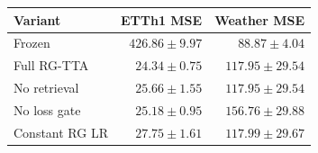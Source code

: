 \begin{tabular}{lrr}
\toprule
Variant & ETTh1 MSE & Weather MSE \\
\midrule
Frozen & $426.86\pm9.97$ & $88.87\pm4.04$ \\
Full RG-TTA & $24.34\pm0.75$ & $117.95\pm29.54$ \\
No retrieval & $25.66\pm1.55$ & $117.95\pm29.54$ \\
No loss gate & $25.18\pm0.95$ & $156.76\pm29.88$ \\
Constant RG LR & $27.75\pm1.61$ & $117.99\pm29.67$ \\
\bottomrule
\end{tabular}
